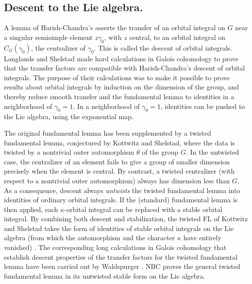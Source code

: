 \documentclass[brochure,english,12pt]{bourbaki}
\begin{document}

\subsection{Descent to the Lie algebra.}

A lemma of Harish-Chandra's asserts the transfer of an orbital
integral on $G$ near a singular semisimple element $z\gamma_0$, with
$z$ central, to an orbital integral on $C_G(\gamma_0)$, the
centralizer of $\gamma_0$.  This is called the descent of orbital
integrals.  Langlands and Shelstad made hard calculations in
Galois cohomology to prove that the transfer factors are compatible
with Harish-Chandra's descent of orbital integrals.  The purpose of
their calculations was to make it possible to prove results about
orbital integrals by induction on the dimension of the group, and
thereby reduce smooth transfer and the fundamental lemma to identities
in a neighborhood of $\gamma_0=1$.  In a neighborhood of $\gamma_0=1$,
identities can be pushed to the Lie algebra, using the exponential map.

The original fundamental lemma has been supplemented by a twisted
fundamental lemma, conjectured by Kottwitz and Shelstad, where the
data is twisted by a nontrivial outer automorphism $\theta$ of the
group $G$.  In the untwisted case, the centralizer of an element fails
to give a group of smaller dimension precisely when the element is
central.  By contrast, a twisted centralizer (with respect to a
nontrivial outer automorphism) always has dimension less than $G$.  As
a consequence, descent always {\it untwists} the twisted fundamental
lemma into identities of ordinary orbital integrals.  If the
(standard) fundamental lemma is then applied, each $\kappa$-orbital
integral can be replaced with a stable orbital integral.  By combining both
descent and stabilization, the twisted FL of Kottwitz and Shelstad
takes the form of identities of stable orbital integrals on the Lie
algebra (from which the automorphism and the character $\kappa$ have
entirely vanished) \cite{twisted-h}.  The corresponding long calculations in Galois
cohomology that establish descent properties of the transfer factors
for the twisted fundamental lemma have been carried out by
Waldspurger \cite{twisted-w}.  NBC proves the general twisted fundamental lemma in
its untwisted stable form on the Lie algebra.
\end{document}
